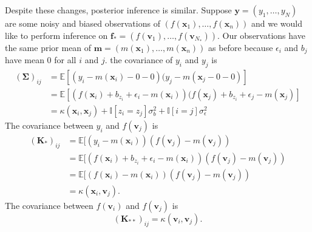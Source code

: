 Despite these changes, posterior inference is similar.
Suppose $\mathbf{y} = (y_1, \ldots, y_N)$ are some noisy and biased observations of $(f(\mathbf{x}_1), \ldots, f(\mathbf{x}_n))$
and we would like to perform inference on $\mathbf{f}_* = (f(\mathbf{v}_1), \ldots, f(\mathbf{v}_{N_{*}}))$.
Our observations have the same prior mean of $\mathbf{m} = (m(\mathbf{x}_1), \ldots, m(\mathbf{x}_n))$ as before because $\epsilon_i$ and $b_j$ have mean 0 for all $i$ and $j$.
the covariance of $y_i$ and $y_{j}$ is
\begin{align*}
    (\mathbf{\Sigma})_{ij}
    &= \mathbb{E}[(y_i - m(\mathbf{x}_i) - 0 - 0)(y_j - m(\mathbf{x}_j - 0 - 0)] \\
    &= \mathbb{E}[(f(\mathbf{x}_i) + b_{z_i} + \epsilon_i - m(\mathbf{x}_i))(f(\mathbf{x}_j) + b_{z_i} + \epsilon_j - m(\mathbf{x}_j)] \\
    &= \kappa(\mathbf{x}_i, \mathbf{x}_{j}) + \mathbb{I}[z_i = z_{j}] \sigma^2_b + \mathbb{I}[i = j]\sigma^2_{ \epsilon }
\end{align*}
The covariance between $y_i$ and $f(\mathbf{v}_j)$ is
\begin{align*}
    (\mathbf{K}_{*})_{ij}
    &= \mathbb{E}[ (y_i - m(\mathbf{x}_i))(f(\mathbf{v}_j) - m(\mathbf{v}_j)) \\
    &= \mathbb{E}[ (f(\mathbf{x}_i) + b_{z_i} + \epsilon_i - m(\mathbf{x}_i))(f(\mathbf{v}_j) - m(\mathbf{v}_j)) \\
    &= \mathbb{E}[ (f(\mathbf{x}_i) - m(\mathbf{x}_i))(f(\mathbf{v}_j) - m(\mathbf{v}_j)) \\
    &= \kappa(\mathbf{x}_i, \mathbf{v}_j).
\end{align*}
The covariance between $f(\mathbf{v}_i)$ and $f(\mathbf{v}_j)$ is
\begin{equation*}
    (\mathbf{K}_{* *})_{ij} = \kappa(\mathbf{v}_i, \mathbf{v}_j).
\end{equation*}
